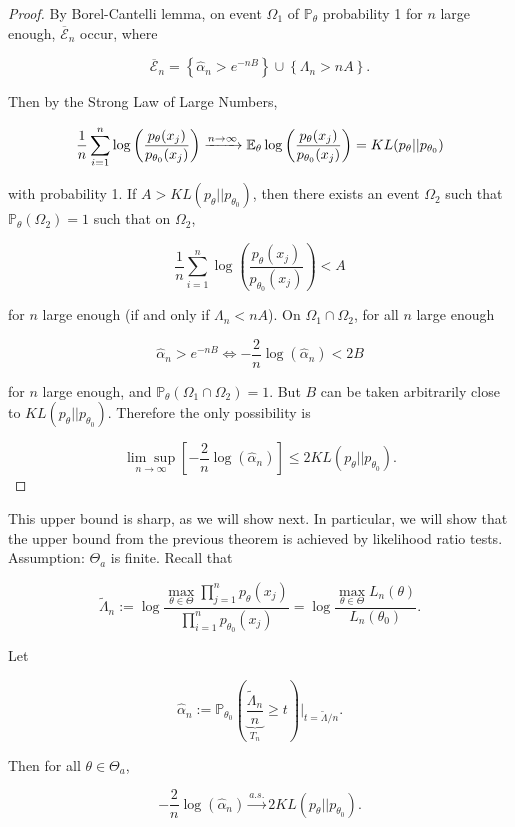 \begin{proof}
By Borel-Cantelli lemma, on event \(\Omega_1\) of \(\mathbb{P}_\theta\) probability 1 for \(n\) large enough, \(\overline{\mathcal{E}}_n\) occur, where

\[
\overline{\mathcal{E}}_n = \left\{ \hat{\alpha}_n > e^{-nB} \right\} \cup \left\{ \Lambda_n > nA \right\}.
\]

Then by the Strong Law of Large Numbers,

\[
\frac{1}{n} \sum_{i=1}^n \log \left( \frac{p_\theta(x_j)}{p_{\theta_0}(x_j)} \right) \xrightarrow{n \to \infty} \E_ \theta  \log \left( \frac{p_\theta(x_j)}{p_{\theta_0}(x_j)} \right) = KL(p_\theta || p_{\theta_0})
\]

with probability 1. If \(A >  KL(p_\theta || p_{\theta_0})\), then there exists an event \(\Omega_2\) such that \(\mathbb{P}_\theta(\Omega_2) = 1\) such that on \(\Omega_2\), 

\[
\frac{1}{n} \sum_{i=1}^n \log \left( \frac{p_\theta(x_j)}{p_{\theta_0}(x_j)} \right)  < A
\]

for \(n\) large enough (if and only if \(\Lambda_n < nA\)). On \(\Omega_1 \cap \Omega_2\), for all \(n\) large enough

\[
\hat{\alpha}_n > e^{-nB} \iff - \frac{2}{n} \log(\hat{\alpha}_n) < 2B
\]

for \(n\) large enough, and \(\mathbb{P}_\theta(\Omega_1 \cap \Omega_2) = 1\). But \(B\) can be taken arbitrarily close to \( KL(p_\theta || p_{\theta_0})\). Therefore the only possibility is

\[
\underset{n \to \infty}{\lim \sup} \left[ - \frac{2}{n} \log(\hat{\alpha}_n)  \right] \leq 2 KL(p_\theta || p_{\theta_0}).
\]

\end{proof}

This upper bound is sharp, as we will show next. In particular, we will show that the upper bound from the previous theorem is achieved by likelihood ratio tests. Assumption: \(\Theta_a\) is finite. Recall that

\[
\tilde{\Lambda}_n := \log \frac{ \max_{\theta \in \Theta} \prod_{j=1}^n  p_\theta(x_j)}{\prod_{i=1}^n p_{\theta_0}(x_j)} =  \log \frac{ \max_{\theta \in \Theta} L_n(\theta) }{L_n(\theta_0)}.
\]

\begin{theorem}

Let 

\[
\hat{\alpha}_n := \mathbb{P}_{\theta_0} \left(  \underbrace{\frac{\tilde{\Lambda}_n}{n}}_{T_n} \geq t \right) \bigg|_{t = \tilde{\Lambda}/n}.
\]

Then for all \(\theta \in \Theta_a\), 

\[
- \frac{2}{n} \log(\hat{\alpha}_n) \xrightarrow{a.s.} 2 KL(p_\theta || p_{\theta_0}).
\]

\end{theorem}

